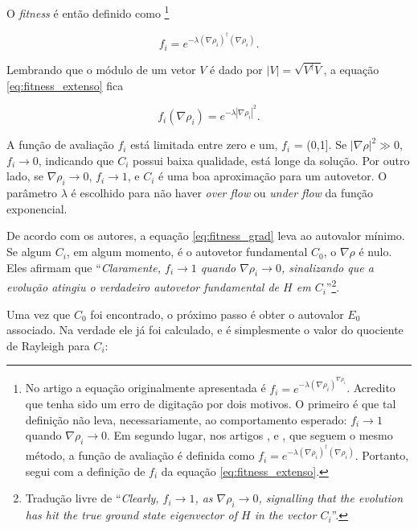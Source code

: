 	O \emph{fitness} é então definido como \footnote{
		No artigo \cite{metodo2004} a equação originalmente apresentada é $f_i = e^{-\lambda (\nabla \rho_i)^{\nabla \rho_i}}$. Acredito que tenha sido um erro de digitação por dois motivos. O primeiro é que tal definição não leva, necessariamente, ao comportamento esperado: $f_i \rightarrow 1$ quando $\nabla \rho_i \rightarrow 0$. Em segundo lugar, nos artigos \cite{metodo2006},  \cite{metodo2008} e \cite{metodo2009}, que seguem o mesmo método, a função de avaliação é definida como $f_i = e^{-\lambda (\nabla \rho_i)^{\dagger} (\nabla \rho_i)}$. Portanto, segui com a definição de $f_i$ da equação \ref{eq:fitness_extenso}.}
	
	\begin{equation}\label{eq:fitness_extenso}
		f_i = e^{-\lambda (\nabla \rho_i)^\dagger (\nabla \rho_i)}.
	\end{equation}
	
	Lembrando que o módulo de um vetor $V$ é dado por $|V| = \sqrt{V^{\dagger} V}$, a equação \ref{eq:fitness_extenso} fica
	
	\begin{equation}\label{eq:fitness_grad}
		f_i(\nabla \rho_i) = e^{-\lambda |\nabla \rho_i|^2}.
	\end{equation}
			 
	A função de avaliação $f_i$ está limitada entre zero e um, $f_i$ = (0,1]. Se $|\nabla \rho|^2 \gg 0$, $f_i \rightarrow 0$, indicando que $C_i$ possui baixa qualidade, está longe da solução. Por outro lado, se $\nabla \rho_i \rightarrow 0 $, $f_i \rightarrow 1$, e $C_i$ é uma boa aproximação para um autovetor. O parâmetro $\lambda$ é escolhido para não haver \emph{over flow} ou \emph{under flow} da função exponencial.
	
	De acordo com os autores, a equação \ref{eq:fitness_grad} leva ao autovalor mínimo. Se algum $C_i$, em algum momento, é o autovetor fundamental $C_0$, o $\nabla \rho$ é nulo. Eles afirmam que ``\textit{Claramente, $f_i \rightarrow 1$ quando $\nabla \rho_i \rightarrow 0$, sinalizando que a evolução atingiu o verdadeiro autovetor fundamental de $H$ em $C_i$}''\footnote{Tradução livre de ``\textit{Clearly, $f_i \rightarrow 1$, as $\nabla \rho_i \rightarrow 0$, signalling that the evolution has hit the true ground state eigenvector of $H$ in the vector $C_i$}''.}. 
	
	Uma vez que $C_0$ foi encontrado, o próximo passo é obter o autovalor $E_0$ associado. Na verdade ele já foi calculado, e é simplesmente o valor do quociente de Rayleigh para $C_i$:
	
